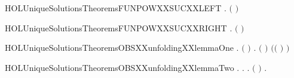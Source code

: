 \newcommand{\HOLUniqueSolutionsDate}{04 Settembre 2019}
\newcommand{\HOLUniqueSolutionsTime}{13:46}
\begin{SaveVerbatim}{HOLUniqueSolutionsTheoremsFUNPOWXXSUCXXLEFT}
\HOLTokenTurnstile{} \HOLSymConst{\HOLTokenForall{}} .   \ensuremath{(} \ensuremath{)} \HOLSymConst{\ensuremath{=}}    \HOLConst{\HOLTokenCompose} 
\end{SaveVerbatim}
\newcommand{\HOLUniqueSolutionsTheoremsFUNPOWXXSUCXXLEFT}{\UseVerbatim{HOLUniqueSolutionsTheoremsFUNPOWXXSUCXXLEFT}}
\begin{SaveVerbatim}{HOLUniqueSolutionsTheoremsFUNPOWXXSUCXXRIGHT}
\HOLTokenTurnstile{} \HOLSymConst{\HOLTokenForall{}} .   \ensuremath{(} \ensuremath{)} \HOLSymConst{\ensuremath{=}}  \HOLConst{\HOLTokenCompose}   
\end{SaveVerbatim}
\newcommand{\HOLUniqueSolutionsTheoremsFUNPOWXXSUCXXRIGHT}{\UseVerbatim{HOLUniqueSolutionsTheoremsFUNPOWXXSUCXXRIGHT}}
\begin{SaveVerbatim}{HOLUniqueSolutionsTheoremsOBSXXunfoldingXXlemmaOne}
\HOLTokenTurnstile{} \HOLSymConst{\HOLTokenForall{}}  .
         \HOLSymConst{\HOLTokenConj{}}   \HOLSymConst{\HOLTokenConj{}}   \ensuremath{(} \ensuremath{)} \HOLSymConst{\HOLTokenImp{}}
       \HOLSymConst{\HOLTokenForall{}}.  \ensuremath{(} \ensuremath{)} \ensuremath{(}\ensuremath{(} \HOLConst{\HOLTokenCompose}   \ensuremath{)} \ensuremath{)}
\end{SaveVerbatim}
\newcommand{\HOLUniqueSolutionsTheoremsOBSXXunfoldingXXlemmaOne}{\UseVerbatim{HOLUniqueSolutionsTheoremsOBSXXunfoldingXXlemmaOne}}
\begin{SaveVerbatim}{HOLUniqueSolutionsTheoremsOBSXXunfoldingXXlemmaTwo}
\HOLTokenTurnstile{} \HOLSymConst{\HOLTokenForall{}}.
         \HOLSymConst{\HOLTokenImp{}}
       \HOLSymConst{\HOLTokenForall{}}  .
             \HOLTokenTransBegin{}\HOLTokenTransEnd {} \HOLSymConst{\HOLTokenImp{}}
           \HOLSymConst{\HOLTokenExists{}}.   \HOLSymConst{\HOLTokenConj{}} \ensuremath{(} \HOLSymConst{\ensuremath{=}}  \ensuremath{)} \HOLSymConst{\HOLTokenConj{}} \HOLSymConst{\HOLTokenForall{}}.   \HOLTokenTransBegin{}\HOLTokenTransEnd {} 
\end{SaveVerbatim}

